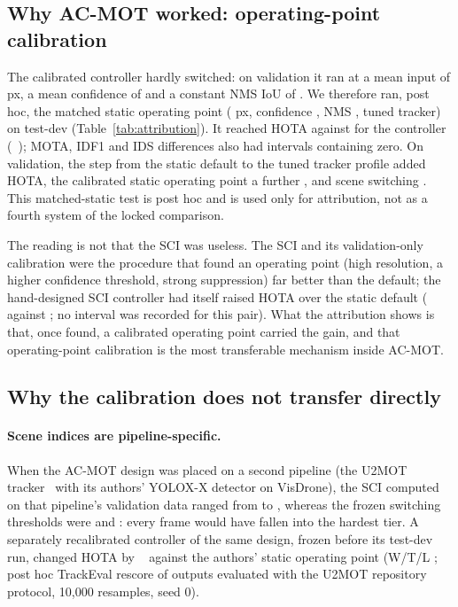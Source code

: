 \documentclass[pdflatex,sn-mathphys-num]{sn-jnl}
\newcommand{\Vz}[1]{\V{#1}~\CI{#1}}
\begin{document}
\subsection{Why AC-MOT worked: operating-point calibration}\label{sec:res_attribution}
The calibrated controller hardly switched: on validation it ran at a mean input of  px, a mean confidence of  and a constant NMS IoU of . We therefore ran, post hoc, the matched static operating point ( px, confidence , NMS , tuned tracker) on test-dev (Table~\ref{tab:attribution}). It reached  HOTA against  for the controller (\Vz{ms.dHOTA}); MOTA, IDF1 and IDS differences also had intervals containing zero. On validation, the step from the static default to the tuned tracker profile added  HOTA, the calibrated static operating point a further , and scene switching . This matched-static test is post hoc and is used only for attribution, not as a fourth system of the locked comparison.



The reading is not that the SCI was useless. The SCI and its validation-only calibration were the procedure that found an operating point (high resolution, a higher confidence threshold, strong suppression) far better than the default; the hand-designed SCI controller had itself raised HOTA over the static default ( against ; no interval was recorded for this pair). What the attribution shows is that, once found, a calibrated operating point carried the gain, and that operating-point calibration is the most transferable mechanism inside AC-MOT.

\subsection{Why the calibration does not transfer directly}\label{sec:res_transfer}
\paragraph{Scene indices are pipeline-specific.} When the AC-MOT design was placed on a second pipeline (the U2MOT tracker~\cite{liu2023u2mot} with its authors' YOLOX-X detector on VisDrone), the SCI computed on that pipeline's validation data ranged from  to , whereas the frozen switching thresholds were  and : every frame would have fallen into the hardest tier. A separately recalibrated controller of the same design, frozen before its test-dev run, changed HOTA by \Vz{u2.dHOTA} against the authors' static operating point (W/T/L ; post hoc TrackEval rescore of outputs evaluated with the U2MOT repository protocol, 10,000 resamples, seed 0).
\end{document}
